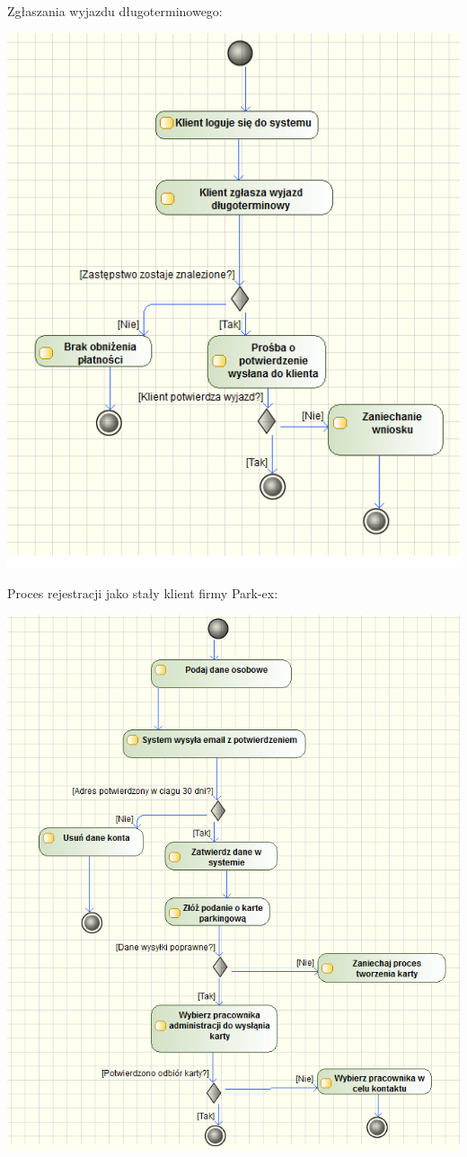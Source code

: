 \documentclass[paper=a4, fontsize=11pt]{scrartcl} %
\begin{document}
Zgłaszania wyjazdu długoterminowego:

\includegraphics[scale=0.7]{3}

Proces rejestracji jako stały klient firmy Park-ex:

\includegraphics[scale=0.7]{4}
\end{document}
